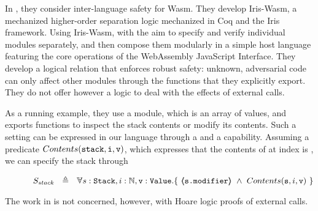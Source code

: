 %
In \cite{irisWasm23}, they consider inter-language safety for Wasm. They develop Iris-Wasm, a mechanized higher-order separation logic mechanized in Coq and the Iris framework. Using Iris-Wasm, with the aim to
specify and verify individual modules separately, and then compose them modularly in a simple host language
featuring the core operations of the WebAssembly JavaScript Interface. They develop a 
logical relation that enforces robust safety: unknown, adversarial code can only aﬀect other modules through
the functions that they explicitly export. 
They do not offer however a logic to deal with the effects of external calls.

As a running example, they use a  module, which is an array of values, and exports functions to inspect the stack contents or modify its contents. 
Such a setting can be expressed in our language through a  and a  capability.
Assuming a predicate $Contents(\mbox{\normalfont{\texttt{stack}}},\mbox{\normalfont{\texttt{i}}},\mbox{\normalfont{\texttt{v}}})$, which expresses that the contents of  at index  is , we can specify the stack through
 
 $$\strut \SPSP  S_{stack}\ \  \triangleq \ \ \TwoStatesN{ s:\prg{Stack},i:\mathbb{N},\prg{v}:\prg{Value}} 
 {\ \inside{\prg{s.modifier}} \ \wedge \ Contents(\prg{s},i,\prg{v})\  }$$  
 
 The work in \cite{irisWasm23}  is not concerned, however, with Hoare logic proofs of external calls.
 
 
 
 
%
%
